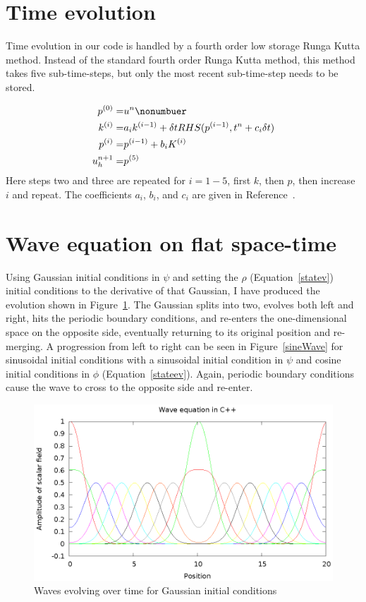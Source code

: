 \section{Time evolution}

Time evolution in our code is handled by a fourth order low storage Runga Kutta method. Instead of the standard fourth order Runga Kutta method, this method takes five sub-time-steps, but only the most recent sub-time-step needs to be stored.

\begin{eqnarray}
  p^{(0)}=&u^n\nonumbuer\\
  k^{(i)}=&a_ik^{(i-1)}+\delta t RHS(p^{(i-1)},t^n+c_i\delta t)\nonumber\\
  p^{(i)}=&p^{(i-1)}+b_iK^{(i)}\nonumber\\
  u_h^{n+1}=&p^{(5)}
\end{eqnarray}
Here steps two and three are repeated for $i=1-5$, first $k$, then $p$, then increase $i$ and repeat. The coefficients $a_i$, $b_i$, and $c_i$ are given in Reference~\cite{dghesthaven}.

\section{Wave equation on flat space-time}

Using Gaussian initial conditions in $\psi$ and setting the $\rho$ (Equation~\ref{statev}) initial conditions to the derivative of that Gaussian, I have produced the evolution shown in Figure~\ref{gaussWave}. The Gaussian splits into two, evolves both left and right, hits the periodic boundary conditions, and re-enters the one-dimensional space on the opposite side, eventually returning to its original position and re-merging. A progression from left to right can be seen in Figure~\ref{sineWave} for sinusoidal initial conditions with a sinusoidal initial condition in $\psi$ and cosine initial conditions in $\phi$ (Equation~\ref{stateev}). Again, periodic boundary conditions cause the wave to cross to the opposite side and re-enter.

\begin{figure}
  \includegraphics{gaussWave}
  \caption{Waves evolving over time for Gaussian initial conditions}
  \label{gaussWave}
\end{figure}

